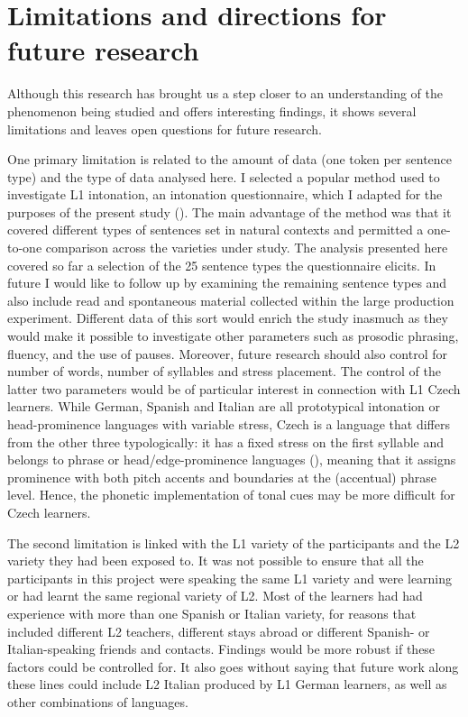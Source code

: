 \section{Limitations and directions for future research}\label{sec:6.2}

Although this research has brought us a step closer to an understanding of the phenomenon being studied and offers interesting findings, it shows several limitations and leaves open questions for future research.


One primary limitation is related to the amount of data (one token per sentence type) and the type of data analysed here. I selected a popular method used to investigate L1 intonation, an intonation questionnaire, which I adapted for the purposes of the present study (). The main advantage of the method was that it covered different types of sentences set in natural contexts and permitted a one-to-one comparison across the varieties under study. The analysis presented here covered so far a selection of the 25 sentence types the questionnaire elicits. In future I would like to follow up by examining the remaining sentence types and also include read and spontaneous material collected within the large production experiment. Different data of this sort would enrich the study inasmuch as they would make it possible to investigate other parameters such as prosodic phrasing, fluency, and the use of pauses. Moreover, future research should also control for number of words, number of syllables and stress placement. The control of the latter two parameters would be of particular interest in connection with L1 Czech learners. While German, Spanish and Italian are all prototypical intonation or head-prominence languages with variable stress, Czech is a language that differs from the other three typologically: it has a fixed stress on the first syllable and belongs to phrase or head/edge-prominence languages (), meaning that it assigns prominence with both pitch accents and boundaries at the (accentual) phrase level. Hence, the phonetic implementation of tonal cues may be more difficult for Czech learners.



The second limitation is linked with the L1 variety of the participants and the L2 variety they had been exposed to. It was not possible to ensure that all the participants in this project were speaking the same L1 variety and were learning or had learnt the same regional variety of L2. Most of the learners had had experience with more than one Spanish or Italian variety, for reasons that included different L2 teachers, different stays abroad or different Spanish- or Italian-speaking friends and contacts. Findings would be more robust if these factors could be controlled for. It also goes without saying that future work along these lines could include L2 Italian produced by L1 German learners, as well as other combinations of languages.



